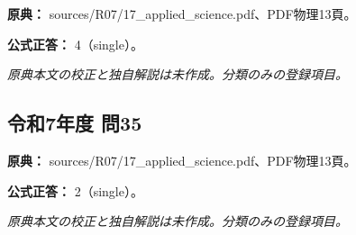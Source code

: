 \noindent\textbf{原典：} sources/R07/17\_applied\_science.pdf、PDF物理13頁。

\textbf{公式正答：} 4（single）。

\par\textit{原典本文の校正と独自解説は未作成。分類のみの登録項目。}

\subsection{令和7年度 問35}
\label{q:r07-reg-applied-35}

\noindent\textbf{原典：} sources/R07/17\_applied\_science.pdf、PDF物理13頁。

\textbf{公式正答：} 2（single）。

\par\textit{原典本文の校正と独自解説は未作成。分類のみの登録項目。}
